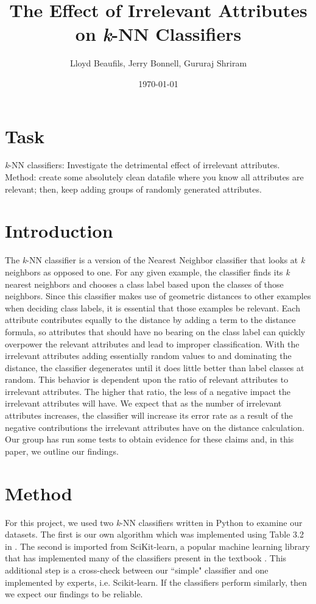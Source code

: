 \documentclass{article}
\title{%
       The Effect of Irrelevant Attributes on \textit{\textit{k}}-NN Classifiers}
\author{Lloyd Beaufils, Jerry Bonnell, Gururaj Shriram}
\date{\today}
\begin{document}
\maketitle

\section{Task}

\textit{\textit{k}}-NN classifiers: Investigate the detrimental effect of irrelevant attributes. Method: create some absolutely clean datafile where you know all attributes are relevant; then, keep adding groups of randomly generated attributes.

\section{Introduction}

The \textit{\textit{k}}-NN classifier is a version of the Nearest Neighbor classifier that looks at \textit{\textit{k}} neighbors as opposed to one. For any given example, the classifier finds its \textit{\textit{k}} nearest neighbors and chooses a class label based upon the classes of those neighbors. Since this classifier makes use of geometric distances to other examples when deciding class labels, it is essential that those examples be relevant. Each attribute contributes equally to the distance by adding a term to the distance formula, so attributes that should have no bearing on the class label can quickly overpower the relevant attributes and lead to improper classification. With the irrelevant attributes adding essentially random values to and dominating the distance, the classifier degenerates until it does little better than label classes at random. This behavior is dependent upon the ratio of relevant attributes to irrelevant attributes. The higher that ratio, the less of a negative impact the irrelevant attributes will have. We expect that as the number of irrelevant attributes increases, the classifier will increase its error rate as a result of the negative contributions the irrelevant attributes have on the distance calculation. Our group has run some tests to obtain evidence for these claims and, in this paper, we outline our findings.

\section{Method}

For this project, we used two \textit{k}-NN classifiers written in Python to examine our datasets. The first is our own algorithm which was implemented using Table 3.2 in \cite{kubat}. The second is imported from SciKit-learn, a popular machine learning library that has implemented many of the classifiers present in the textbook \cite{scikit}. This additional step is a cross-check between our ``simple" classifier and one implemented by experts, i.e. Scikit-learn. If the classifiers perform similarly, then we expect our findings to be reliable.  \\  
\end{document}

